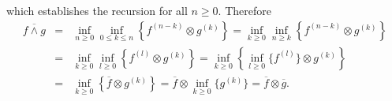 which establishes the recursion for all $n \geq 0$. Therefore
\begin{eqnarray*}
\overline{ f \wedge g} & = & \inf_{n \geq 0} \inf_{0 \leq k \leq n} \left\{ f^{(n-k)} \otimes  g^{(k)} \right\}
             =  \inf_{k \geq 0} \inf_{n \geq k} \left\{ f^{(n-k)} \otimes  g^{(k)} \right\} \\
            & = &  \inf_{k \geq 0} \inf_{l \geq 0} \left\{ f^{(l)} \otimes  g^{(k)} \right\}
             =  \inf_{k \geq 0} \left\{ \inf_{l \geq 0} \{ f^{(l)} \} \otimes  g^{(k)} \right\} \\
            & = & \inf_{k \geq 0} \left\{ \overline{f} \otimes  g^{(k)} \right\}
             =  \overline{f} \otimes \inf_{k \geq 0} \{ g^{(k)} \} =
                 \overline{f} \otimes  \overline{g}.
\end{eqnarray*}


